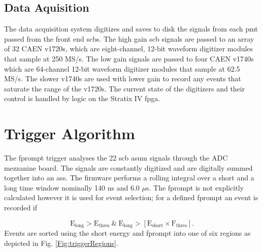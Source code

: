 \subsection{Data Aquisition}
The data acquisition system digitizes and saves to disk the signals from each \gls{pmt} passed from the front end \gls{scb}s. The high gain \gls{scb} signals are passed to an array of 32 CAEN \gls{v1720}s, which are eight-channel, 12-bit waveform digitizer modules that sample at 250 MS/s. The low gain signals are passed to four CAEN \gls{v1740}s which are 64-channel 12-bit waveform digitizer modules that sample at 62.5 MS/s. The slower \gls{v1740}s are used with lower gain to record any events that saturate the range of the \gls{v1720}s. The current state of the digitizers and their control is handled by logic on the Stratix IV \gls{fpga}.

\section{Trigger Algorithm}
\label{sec:triggerAlgorithm}
The \gls{fprompt} trigger analyses the 22 \gls{scb} \gls{asum} signals through the ADC mezzanine board. The signals are constantly digitized and are digitally summed together into an \gls{ass}. The firmware performs a rolling integral over a short and a long time window nominally 140 ns and 6.0 $\mu$s. The \gls{fprompt} is not explicitly calculated however it is used for event selection; for a defined \gls{fprompt} an event is recorded if

\begin{equation}
\text{E}_{\text{long}} > \text{E}_{\text{thres}} \ \& \ \text{E}_{\text{long}} >\left[ \text{E}_{\text{short}} \times \text{F}_{\text{thres}}\right].
\label{Eq:fpromptDecision} 
\end{equation}
Events are sorted using the short energy and \gls{fprompt} into one of six regions as depicted in Fig. \ref{Fig:triggerRegions}.

